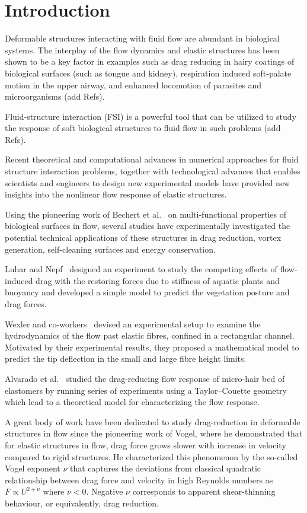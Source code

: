 \documentclass[preprint, letterpaper, nobibnotes, aps, superscriptaddress,prb]{revtex4-1}
\begin{document}
\section{Introduction}

Deformable structures interacting with fluid flow are abundant in biological systems. The interplay of the flow dynamics and elastic structures has been shown to be a key factor in examples such as drag reducing in hairy coatings of biological surfaces (such as tongue\cite{} and kidney\cite{}), respiration induced soft-palate motion in the upper airway, and enhanced locomotion of parasites and microorganisms (add Refs). 

Fluid-structure interaction (FSI) is a powerful tool that can be utilized to study the response of soft biological structures to fluid flow in such problems (add Refs).  

Recent theoretical and computational advances in numerical approaches for fluid structure interaction problems, together with technological advances that enables scientists and engineers to design new experimental models have provided new insights into the nonlinear flow response of elastic structures.

Using the pioneering work of Bechert et al.~\cite{Bechert97} on multi-functional properties of biological surfaces in flow, several studies have experimentally investigated the potential technical applications of these structures in drag reduction, vortex generation, self-cleaning surfaces and energy conservation. 

Luhar and Nepf~\cite{Luhar11} designed an experiment to study the competing effects of flow-induced drag with the restoring forces due to stiffness of aquatic plants and buoyancy and developed a simple model to predict the vegetation posture and drag forces.

Wexler and co-workers~\cite{Wexler13} devised an experimental setup to examine the hydrodynamics of the flow past elastic fibres, confined in a rectangular channel. Motivated by their experimental results, they proposed a mathematical model to predict the tip deflection in the small and large fibre height limits.

Alvarado et al.~\cite{Alvarado17} studied the drag-reducing flow response of micro-hair bed of elastomers by running series of experiments using a Taylor--Couette geometry which lead to a theoretical model for characterizing the flow response. 

A great body of work have been dedicated to study drag-reduction in deformable structures in flow since the pioneering work of Vogel, where he demonstrated that for elastic structures in flow, drag force grows slower with increase in velocity compared to rigid structures. He characterized this phenomenon by the so-called Vogel exponent $\nu$ that captures the deviations from classical quadratic relationship between drag force and velocity in high Reynolds numbers as $F\propto U^{2+\nu}$ where $\nu<0$. Negative $\nu$ corresponds to apparent shear-thinning behaviour, or equivalently, drag reduction.
\end{document}
